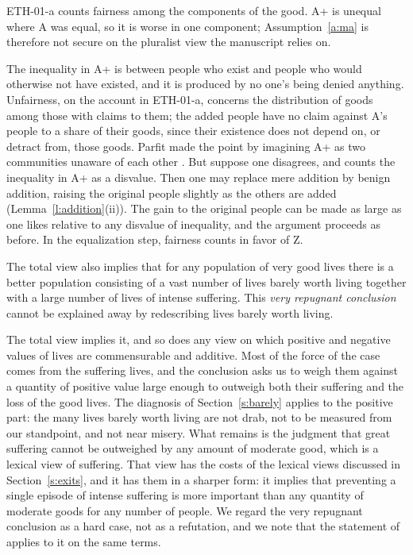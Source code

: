 \documentclass{situationist-preprint}
\begin{document}
\begin{objection}
ETH-01-a counts fairness among the components of the good. A+ is unequal where A was equal, so it is worse in one component; Assumption~\ref{a:ma} is therefore not secure on the pluralist view the manuscript relies on.
\end{objection}

\begin{reply}
The inequality in A+ is between people who exist and people who would otherwise not have existed, and it is produced by no one's being denied anything. Unfairness, on the account in ETH-01-a, concerns the distribution of goods among those with claims to them; the added people have no claim against A's people to a share of their goods, since their existence does not depend on, or detract from, those goods. Parfit made the point by imagining A+ as two communities unaware of each other \citep[ch.~19]{Parfit1984}. But suppose one disagrees, and counts the inequality in A+ as a disvalue. Then one may replace mere addition by benign addition, raising the original people slightly as the others are added (Lemma~\ref{l:addition}(ii)). The gain to the original people can be made as large as one likes relative to any disvalue of inequality, and the argument proceeds as before. In the equalization step, fairness counts in favor of Z.
\end{reply}

\begin{objection}
The total view also implies that for any population of very good lives there is a better population consisting of a vast number of lives barely worth living together with a large number of lives of intense suffering. This \emph{very repugnant conclusion} \citep{Arrhenius2000} cannot be explained away by redescribing lives barely worth living.
\end{objection}

\begin{reply}
The total view implies it, and so does any view on which positive and negative values of lives are commensurable and additive. Most of the force of the case comes from the suffering lives, and the conclusion asks us to weigh them against a quantity of positive value large enough to outweigh both their suffering and the loss of the good lives. The diagnosis of Section~\ref{s:barely} applies to the positive part: the many lives barely worth living are not drab, not to be measured from our standpoint, and not near misery. What remains is the judgment that great suffering cannot be outweighed by any amount of moderate good, which is a lexical view of suffering. That view has the costs of the lexical views discussed in Section~\ref{s:exits}, and it has them in a sharper form: it implies that preventing a single episode of intense suffering is more important than any quantity of moderate goods for any number of people. We regard the very repugnant conclusion as a hard case, not as a refutation, and we note that the statement of \citet{Zuber2021} applies to it on the same terms.
\end{reply}
\end{document}
